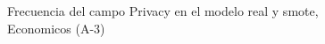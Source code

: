 \begin{figure}[H]
    \centering
    
    \caption{Frecuencia del campo Privacy en el modelo real y smote, Economicos (A-3)}
    \label{frecuency-Privacy-smote-enc}
\end{figure}